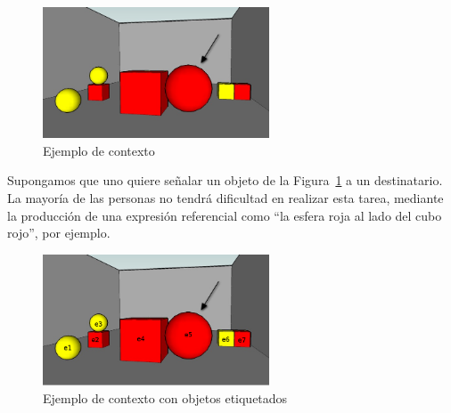 
\begin{figure}[ht]
\centering
\includegraphics[width=0.6\textwidth]{images/22sinletras.jpg}
\caption{Ejemplo de contexto}
\label{GRE3D7-stimulus1}
\end{figure}


Supongamos que uno quiere se\~nalar un objeto de la Figura~\ref{GRE3D7-stimulus1} a un destinatario. La mayor\'{i}a de las personas
no tendr\'a dificultad en realizar esta tarea, mediante la producci\'on de una expresi\'on referencial como ``la
esfera roja al lado del cubo rojo'', por ejemplo. \\

\begin{figure}[ht]
\centering
\includegraphics[width=0.6\textwidth]{images/22.jpg}
\caption{Ejemplo de contexto con objetos etiquetados}
\label{GRE3D7-stimulus2}
\end{figure}

